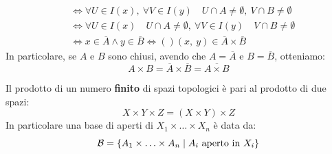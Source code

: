 \begin{demonstration}
\begin{enumerate}[label=\Roman*]
\begin{align*}
&\iff \forall U\in I\left(x\right),\ \forall V\in I\left(y\right)\quad U\cap A\neq \emptyset ,\ V\cap B\neq \emptyset\\
&\iff \forall U\in I\left(x\right)\quad U\cap A\neq \emptyset ,\ \forall V\in I\left(y\right)\quad V\cap B\neq \emptyset\\
&\iff x\in\overline{A}\wedge y\in \overline{B}\iff\left(\right)\left(x,\ y\right)\in\overline{A}\times \overline{B}
\end{align*}
In particolare, se $A$ e $B$ sono chiusi, avendo che $A=\overline{A}$ e $B=\overline{B}$, otteniamo:
\begin{equation*}
A\times B=\overline{A}\times \overline{B}=\overline{A\times B}
\end{equation*}
\end{enumerate}
\vspace{-6mm}
\end{demonstration}
\begin{observe}
Il prodotto di un numero \textbf{finito} di spazi topologici è pari al prodotto di due spazi:
\begin{equation*}
X\times Y\times Z=\left(X\times Y\right)\times Z
\end{equation*}
In particolare una base di aperti di $X_1\times \ldots \times X_n$ è data da:
\begin{equation*}
\mathcal{B}=\left\{A_1\times \ldots \times A_n\mid A_i\text{ aperto in } X_i\right\}
\end{equation*}
\vspace{-6mm}
\end{observe}
